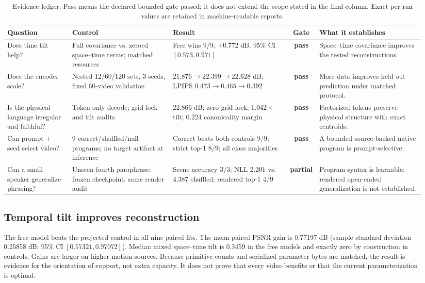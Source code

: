 \documentclass{article}
\newcommand{\good}{\textcolor{teal!65!black}{\textbf{pass}}}
\newcommand{\partialgate}{\textcolor{orange!85!black}{\textbf{partial}}}
\begin{document}
\begin{table}[t]
\centering
\caption{Evidence ledger. Pass means the declared bounded gate passed; it does not extend the
scope stated in the final column. Exact per-run values are retained in machine-readable reports.}
\label{tab:evidence}
\small
\begin{tabularx}{\textwidth}{@{}p{2.55cm}p{3.05cm}Xcp{3.35cm}@{}}
\toprule
Question & Control & Result & Gate & What it establishes \\
\midrule
Does time tilt help? & Full covariance vs. zeroed space--time terms; matched resources &
Free wins 9/9; $+0.772$ dB, 95\% CI $[0.573,0.971]$ & \good &
Space--time covariance improves the tested reconstructions. \\
Does the encoder scale? & Nested 12/60/120 sets, 3 seeds, fixed 60-video validation &
$21.876\rightarrow22.399\rightarrow22.628$ dB; LPIPS $0.473\rightarrow0.465\rightarrow0.392$ & \good &
More data improves held-out prediction under matched protocol. \\
Is the physical language irregular and faithful? & Token-only decode; grid-lock and tilt audits &
22.866 dB; zero grid lock; $1.042\times$ tilt; 0.224 canonicality margin & \good &
Factorized tokens preserve physical structure with exact centroids. \\
Can prompt + seed select video? & 9 correct/shuffled/null programs; no target artifact at inference &
Correct beats both controls 9/9; strict top-1 8/9; all class majorities & \good &
A bounded source-backed native program is prompt-selective. \\
Can a small speaker generalize phrasing? & Unseen fourth paraphrase; frozen checkpoint; same render audit &
Scene accuracy 3/3; NLL 2.201 vs. 4.387 shuffled; rendered top-1 4/9 & \partialgate &
Program syntax is learnable; rendered open-ended generalization is not established. \\
\bottomrule
\end{tabularx}
\end{table}

\subsection{Temporal tilt improves reconstruction}

The free model beats the projected control in all nine paired fits. The mean paired PSNR gain is
0.77197 dB (sample standard deviation 0.25858 dB; 95\% CI $[0.57321,0.97072]$). Median mixed
space--time tilt is 0.3459 in the free models and exactly zero by construction in controls. Gains are
larger on higher-motion sources. Because primitive counts and serialized parameter bytes are
matched, the result is evidence for the orientation of support, not extra capacity. It does not
prove that every video benefits or that the current parameterization is optimal.
\end{document}

